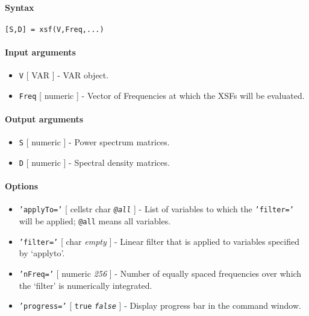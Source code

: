 


	\paragraph{Syntax}

\begin{verbatim}
[S,D] = xsf(V,Freq,...)
\end{verbatim}

\paragraph{Input arguments}

\begin{itemize}
\item
  \texttt{V} {[} VAR {]} - VAR object.
\item
  \texttt{Freq} {[} numeric {]} - Vector of Frequencies at which the
  XSFs will be evaluated.
\end{itemize}

\paragraph{Output arguments}

\begin{itemize}
\item
  \texttt{S} {[} numeric {]} - Power spectrum matrices.
\item
  \texttt{D} {[} numeric {]} - Spectral density matrices.
\end{itemize}

\paragraph{Options}

\begin{itemize}
\item
  \texttt{'applyTo='} {[} cellstr \textbar{} char \textbar{}
  \emph{\texttt{@all}} {]} - List of variables to which the
  \texttt{'filter='} will be applied; \texttt{@all} means all variables.
\item
  \texttt{'filter='} {[} char \textbar{} \emph{empty} {]} - Linear
  filter that is applied to variables specified by `applyto'.
\item
  \texttt{'nFreq='} {[} numeric \textbar{} \emph{256} {]} - Number of
  equally spaced frequencies over which the `filter' is numerically
  integrated.
\item
  \texttt{'progress='} {[} \texttt{true} \textbar{}
  \emph{\texttt{false}} {]} - Display progress bar in the command
  window.
\end{itemize}

